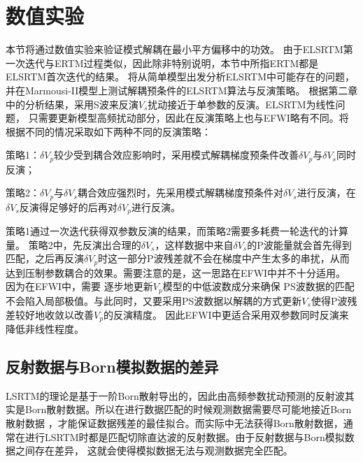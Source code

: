 \section{数值实验}
本节将通过数值实验来验证模式解耦在最小平方偏移中的功效。
由于ELSRTM第一次迭代与ERTM过程类似，因此除非特别说明，本节中所指ERTM都是ELSRTM首次迭代的结果。
将从简单模型出发分析ELSRTM中可能存在的问题，并在Marmousi-II模型上测试解耦预条件的ELSRTM算法与反演策略。
根据第二章中的分析结果，采用S波来反演$V_s$扰动接近于单参数的反演。ELSRTM为线性问题，
只需要更新模型高频扰动部分，因此在反演策略上也与EFWI略有不同。将根据不同的情况采取如下两种不同的反演策略：

策略1：$\delta V_p$较少受到耦合效应影响时，采用模式解耦梯度预条件改善$\delta V_p$与$\delta V_s$同时反演；

策略2：$\delta V_p$与$\delta V_s$耦合效应强烈时，先采用模式解耦梯度预条件对$\delta V_s$进行反演，在$\delta
V_s$反演得足够好的后再对$\delta V_p$进行反演。

策略1通过一次迭代获得双参数反演的结果，而策略2需要多耗费一轮迭代的计算量。
策略2中，先反演出合理的$\delta V_s$，这样数据中来自$\delta
V_s$的P波能量就会首先得到匹配，之后再反演$\delta
V_p$时这一部分P波残差就不会在梯度中产生太多的串扰，从而达到压制参数耦合的效果。需要注意的是，这一思路在EFWI中并不十分适用。
因为在EFWI中，需要
逐步地更新$V_p$模型的中低波数成分来确保
PS波数据的匹配不会陷入局部极值。与此同时，又要采用PS波数据以解耦的方式更新$V_s$使得P波残差较好地收敛以改善$V_p$的反演精度。
因此EFWI中更适合采用双参数同时反演来降低非线性程度。


\subsection{反射数据与Born模拟数据的差异}
LSRTM的理论是基于一阶Born散射导出的，因此由高频参数扰动预测的反射波其实是Born散射数据。所以在进行数据匹配的时候观测数据需要尽可能地接近Born散射数据
，才能保证数据残差的最佳拟合。而实际中无法获得Born散射数据，通常在进行LSRTM时都是匹配切除直达波的反射数据。由于反射数据与Born模拟数据之间存在差异，
这就会使得模拟数据无法与观测数据完全匹配。

